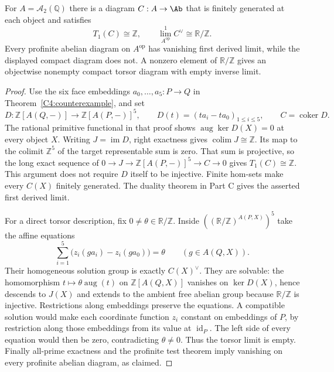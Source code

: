 \begin{corollary}
\label{C4:compact-obstruction}
For $A=\mathcal A_2(\mathbb Q)$ there is a diagram $C:A\to\Ab$
that is finitely generated at each object and satisfies
\[
 T_1(C)\cong\mathbb Z,
 \qquad
 \lim_{A^{\mathrm{op}}}^{1} C^\vee\cong\mathbb R/\mathbb Z.
\]
Every profinite abelian diagram on $A^{\mathrm{op}}$ has vanishing
first derived limit, while the displayed compact diagram does not.
A nonzero element of $\mathbb R/\mathbb Z$ gives an objectwise
nonempty compact torsor diagram with empty inverse limit.
\end{corollary}
\begin{proof}
Use the six face embeddings $a_0,\ldots,a_5:P\to Q$ in
Theorem~\ref{C4:counterexample}, and set
\[
 D:\mathbb Z[A(Q,-)]\longrightarrow\mathbb Z[A(P,-)]^5,
 \qquad D(t)=(ta_i-ta_0)_{1\leq i\leq5},
 \qquad C=\operatorname{coker}D.
\]
The rational primitive functional in that proof shows
$\operatorname{aug}\ker D(X)=0$ at every object $X$.
Writing $J=\operatorname{im}D$, right exactness gives
$\operatorname{colim}J\cong\mathbb Z$. Its map to the colimit
$\mathbb Z^5$ of the target representable sum is zero. That sum
is projective, so the long exact sequence of
$0\to J\to\mathbb Z[A(P,-)]^5\to C\to0$ gives
$T_1(C)\cong\mathbb Z$. This argument does not require $D$ itself
to be injective. Finite hom-sets make every $C(X)$ finitely generated.
The duality theorem in Part C gives the asserted first derived limit.

For a direct torsor description, fix $0\ne\theta\in\mathbb R/\mathbb Z$.
Inside
$((\mathbb R/\mathbb Z)^{A(P,X)})^5$ take the affine equations
\[
 \sum_{i=1}^5\bigl(z_i(ga_i)-z_i(ga_0)\bigr)=\theta
       \qquad(g\in A(Q,X)).
\]
Their homogeneous solution group is exactly $C(X)^\vee$.
They are solvable: the homomorphism
$t\mapsto\theta\operatorname{aug}(t)$ on
$\mathbb Z[A(Q,X)]$ vanishes on $\ker D(X)$, hence descends to
$J(X)$ and extends to the ambient free abelian group because
$\mathbb R/\mathbb Z$ is injective. Restrictions along embeddings
preserve the equations. A compatible solution would make each
coordinate function $z_i$ constant on embeddings of $P$, by
restriction along those embeddings from its value at $\operatorname{id}_P$.
The left side of every equation would then be zero, contradicting
$\theta\ne0$. Thus the torsor limit is empty. Finally all-prime
exactness and the profinite test theorem imply vanishing on every
profinite abelian diagram, as claimed.
\end{proof}
